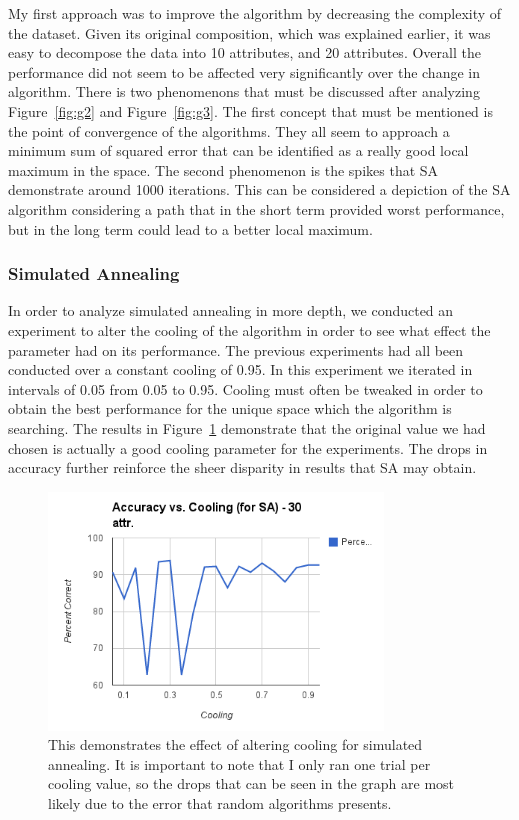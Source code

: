 \documentclass[annual]{acmsiggraph}
\begin{document}
My first approach was to improve the algorithm by decreasing the complexity of the dataset. Given its original composition,
which was explained earlier, it was easy to decompose the data into 10 attributes, and 20 attributes. Overall the performance
did not seem to be affected very significantly over the change in algorithm. There is two phenomenons that must be discussed
after analyzing Figure~\ref{fig:g2} and Figure~\ref{fig:g3}. The first concept that must be mentioned is the point of
convergence of the algorithms. They all seem to approach a minimum sum of squared error that can be identified as a really
good local maximum in the space. The second phenomenon is the spikes that SA demonstrate around 1000 iterations. This can be
considered a depiction of the SA algorithm considering a path that in the short term provided worst performance, but in the
long term could lead to a better local maximum.
  
\subsubsection{Simulated Annealing}
In order to analyze simulated annealing in more depth, we conducted an experiment to alter the cooling of the algorithm in order
to see what effect the parameter had on its performance. The previous experiments had all been conducted over a constant cooling
of 0.95. In this experiment we iterated in intervals of 0.05 from 0.05 to 0.95. Cooling must often be tweaked in order to obtain
the best performance for the unique space which the algorithm is searching. The results in Figure~\ref{fig:g5} demonstrate that
the original value we had chosen is actually a good cooling parameter for the experiments. The drops in accuracy further reinforce
the sheer disparity in results that SA may obtain.
\begin{figure}[ht]
  \centering
  \includegraphics[width=3.5in]{charts/g5_accuracy_vs_cooling_for_sa.png}
  \caption{This demonstrates the effect of altering cooling for simulated annealing. It is important to note that I only ran one
  trial per cooling value, so the drops that can be seen in the graph are most likely due to the error that random algorithms
  presents.}
  \label{fig:g5}
\end{figure}
\end{document}
